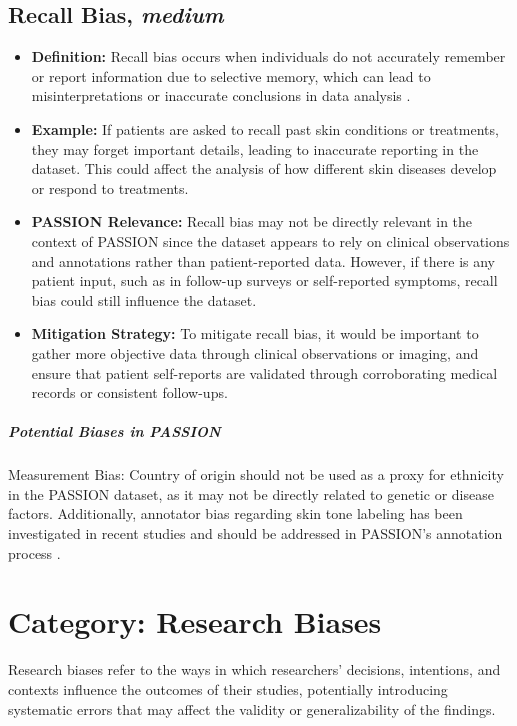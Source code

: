 \begin{refsection}
		\subsection{Recall Bias, \textit{medium}}
		\begin{itemize}
			\item \textbf{Definition:} Recall bias occurs when individuals do not accurately remember or report information due to selective memory, which can lead to misinterpretations or inaccurate conclusions in data analysis \autocites{Mester_2022}{Chakraborty_2024}.
			\item \textbf{Example:} If patients are asked to recall past skin conditions or treatments, they may forget important details, leading to inaccurate reporting in the dataset. This could affect the analysis of how different skin diseases develop or respond to treatments.
			\item \textbf{PASSION Relevance:} Recall bias may not be directly relevant in the context of PASSION since the dataset appears to rely on clinical observations and annotations rather than patient-reported data. However, if there is any patient input, such as in follow-up surveys or self-reported symptoms, recall bias could still influence the dataset.
			\item \textbf{Mitigation Strategy:} To mitigate recall bias, it would be important to gather more objective data through clinical observations or imaging, and ensure that patient self-reports are validated through corroborating medical records or consistent follow-ups.
		\end{itemize}
		
		\subparagraph{Potential Biases in PASSION}
		Measurement Bias: Country of origin should not be used as a proxy for ethnicity in the PASSION dataset, as it may not be directly related to genetic or disease factors. Additionally, annotator bias regarding skin tone labeling has been investigated in recent studies and should be addressed in PASSION's annotation process \autocite{Montoya_2025}.
		
		
		\section{\textbf{Category:} Research Biases}
		Research biases refer to the ways in which researchers' decisions, intentions, and contexts influence the outcomes of their studies, potentially introducing systematic errors that may affect the validity or generalizability of the findings.
		

\end{refsection}
